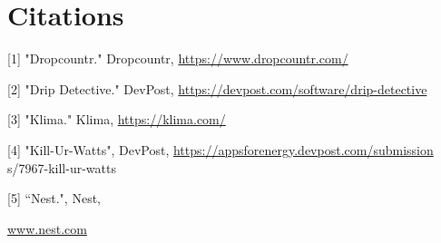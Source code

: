 \documentclass[10pt]{article}
\begin{document}
\section{Citations}
[1] "Dropcountr." Dropcountr, \href{https://www.dropcountr.com/}{https://www.dropcountr.com/}

[2] "Drip Detective." DevPost, \href{https://devpost.com/software/drip-detective}{https://devpost.com/software/drip-detective}

[3] "Klima." Klima, \href{https://klima.com/}{https://klima.com/}

[4] "Kill-Ur-Watts", DevPost, \href{https://appsforenergy.devpost.com/submission}{https://appsforenergy.devpost.com/submission} s/7967-kill-ur-watts

[5] “Nest.", Nest,

\href{http://www.nest.com}{www.nest.com}
\end{document}
